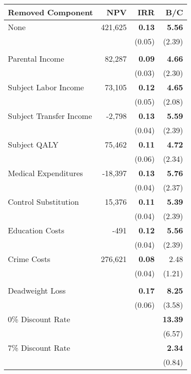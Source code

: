 \begin{tabular}{l r r r}																			
\toprule																															
Removed Component       &       NPV     &       IRR     &       B/C     \\																			
\midrule																			
None	&	421,625	&	\textbf{0.13}	&	\textbf{5.56}	\\
	&				&	(0.05)	&	(2.39)	\\ \\
Parental Income	&	82,287	&	\textbf{0.09}	&	\textbf{4.66}	\\
	&		&	(0.03)	&	(2.30)	\\
Subject Labor Income		&	73,105	&	\textbf{0.12}	&	\textbf{4.65}	\\
	&		&	(0.05)	&	(2.08)	\\
Subject Transfer Income	&	-2,798	&	\textbf{0.13}	&	\textbf{5.59}	\\
	&		&	(0.04)	&	(2.39)	\\
Subject QALY	&	75,462	&	\textbf{0.11}	&	\textbf{4.72}	\\
	&		&	(0.06)	&	(2.34)	\\
Medical Expenditures	&	-18,397	&	\textbf{0.13}	&	\textbf{5.76}	\\
	&	&	(0.04)	&	(2.37)	\\
Control Substitution	&		15,376	&	\textbf{0.11}	&	\textbf{5.39}	\\
	&	&	(0.04)	&	(2.39)	\\
Education Costs	&	-491	&	\textbf{0.12}	&	\textbf{5.56}	\\
	&			&	(0.04)	&	(2.39)	\\
Crime Costs	&	276,621	&	\textbf{0.08}	&	2.48	\\
	&	&	(0.04)	&	(1.21)	\\ \\
Deadweight Loss	&		&	\textbf{0.17}	&	\textbf{8.25}	\\
	&		&	(0.06)	&	(3.58)	\\
0\% Discount Rate	&		&		&	\textbf{13.39}	\\
			&			&		&	(6.57)	\\
7\% Discount Rate	&		&		&	\textbf{2.34}	\\
	&		&		&	(0.84)	\\
\bottomrule																			
\end{tabular}																			
